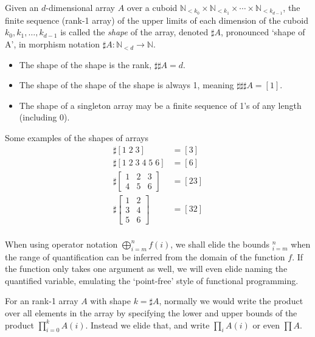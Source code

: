 \documentclass{DIKU-report-variant}
\newcommand\Nat{\mathbb{N}}
\begin{document}
\begin{definition}
  \label{def:shape}
  Given an \(d\)-dimensional array \(A\) over a cuboid
  \(\Nat_{<k_0} \times \Nat_{<k_1} \times \cdots \times \Nat_{<k_{d-1}}\),
  the finite sequence (rank-1 array) of the upper limits of each dimension of the cuboid
  \(k_0, k_1, \dots, k_{d-1}\) is called the \emph{shape} of the array, denoted
  \(\sharp A\), pronounced `shape of A', in morphism notation \(\sharp A : \Nat_{<d} \to \Nat\). 
\end{definition}
\begin{observation}
  \label{ob:shape}
  \begin{itemize}
    \item The shape of the shape is the rank, \(\sharp \sharp A = d\).
    \item The shape of the shape of the shape is always 1, meaning \(\sharp \sharp \sharp A = [1]\).
    \item The shape of a singleton array may be a finite sequence of 1's of any length (including 0).
  \end{itemize}
\end{observation}

\begin{example}
  Some examples of the shapes of arrays
  \begin{align*}
    \sharp [1\; 2\; 3] &= [3] \\
    \sharp [1\; 2\; 3\; 4\; 5\; 6] &= [6] \\
    \sharp \begin{bmatrix}
      1 & 2 & 3 \\ 4 & 5 & 6
    \end{bmatrix} &= [2 3] \\
    \sharp \begin{bmatrix}
      1 & 2 \\ 3 & 4 \\ 5 & 6
    \end{bmatrix} &= [3 2] \\
  \end{align*}
\end{example}

\begin{remark}
  \label{rem:quant-elision}
  When using operator notation \(\bigoplus_{i=m}^n f(i)\),
  we shall elide the bounds \({}_{i=m}^n\) when the range of quantification can
  be inferred from the domain of the function \(f\). If the function only
  takes one argument as well, we will even elide naming the quantified variable,
  emulating the `point-free' style of functional programming.

  For an rank-1 array \(A\) with shape \(k = \sharp A\), normally we would
  write the product over all elements in the array by specifying the lower
  and upper bounds of the product \(\prod_{i=0}^{k} A(i)\). Instead we elide
  that, and write \(\prod_i A(i)\) or even \(\prod A\).
\end{remark}
\end{document}
